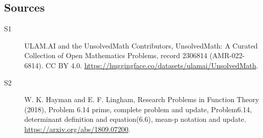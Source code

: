 \documentclass[11pt]{article}
\begin{document}
\subsection{Sources}
\begin{description}
\item[\hypertarget{source:2306814:1}{S1}] ULAM.AI and the UnsolvedMath Contributors, UnsolvedMath: A Curated Collection of Open Mathematics Problems, record 2306814 (AMR-022-6814). CC BY 4.0. \url{https://huggingface.co/datasets/ulamai/UnsolvedMath}.
\item[\hypertarget{source:2306814:2}{S2}] W. K. Hayman and E. F. Lingham, Research Problems in Function Theory (2018), Problem 6.14 prime, complete problem and update, Problem6.14, determinant definition and equation(6.6), mean-p notation and update. \url{https://arxiv.org/abs/1809.07200}.
\end{description}
\label{end:2306814}
\end{document}
